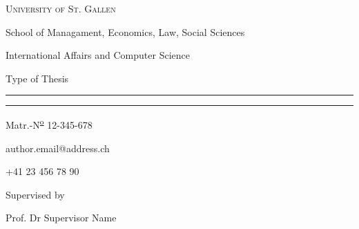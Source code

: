 \begin{titlepage}
    \begin{center}
        \large
        \vspace*{.5\baselineskip}
        
            {\Large\scshape University of St. Gallen}
            
            School of Managament, Economics, Law, Social Sciences
    
            International Affairs and Computer Science
            
        \vspace{\fill}
            
            Type of Thesis
            
        \vspace{-.5\baselineskip}
            
            \rule{4.25in}{0.5pt}
            
        \vspace{.5\baselineskip}
    
            {\LARGE\scshape\thetitle}
            
            \rule{4.25in}{0.5pt}
    
            \thedate
    
        \vspace{\fill}
            
            \theauthor
            
            Matr.-N\textsuperscript{\underline{\scriptsize o}} 12-345-678
    
            author.email@address.ch
            
            +41 23 456 78 90
    
        \vspace{\fill}
            
            Supervised by
            
            Prof. Dr Supervisor Name
    
        \vspace{\fill}
    \end{center}
\end{titlepage}